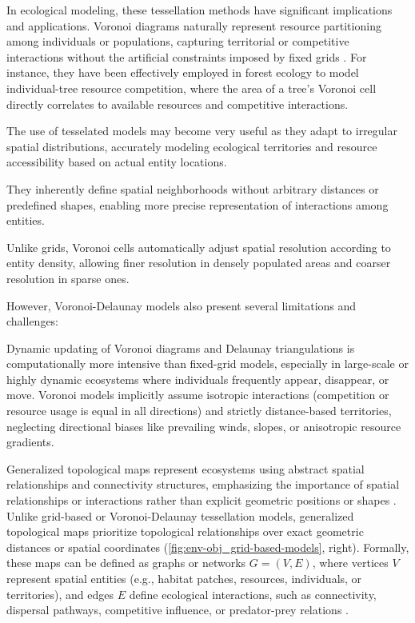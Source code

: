 In ecological modeling, these tessellation methods have significant implications and applications. Voronoi diagrams naturally represent resource partitioning among individuals or populations, capturing territorial or competitive interactions without the artificial constraints imposed by fixed grids \cite{Castle2006}. For instance, they have been effectively employed in forest ecology to model individual-tree resource competition, where the area of a tree's Voronoi cell directly correlates to available resources and competitive interactions.

The use of tesselated models may become very useful as they adapt to irregular spatial distributions, accurately modeling ecological territories and resource accessibility based on actual entity locations.

They inherently define spatial neighborhoods without arbitrary distances or predefined shapes, enabling more precise representation of interactions among entities.

Unlike grids, Voronoi cells automatically adjust spatial resolution according to entity density, allowing finer resolution in densely populated areas and coarser resolution in sparse ones.

However, Voronoi-Delaunay models also present several limitations and challenges:
\begin{Itemize}
    \Item{} Dynamic updating of Voronoi diagrams and Delaunay triangulations is computationally more intensive than fixed-grid models, especially in large-scale or highly dynamic ecosystems where individuals frequently appear, disappear, or move.
    \Item{} Voronoi models implicitly assume isotropic interactions (competition or resource usage is equal in all directions) and strictly distance-based territories, neglecting directional biases like prevailing winds, slopes, or anisotropic resource gradients.
\end{Itemize}


Generalized topological maps represent ecosystems using abstract spatial relationships and connectivity structures, emphasizing the importance of spatial relationships or interactions rather than explicit geometric positions or shapes \cite{Urban2009}. Unlike grid-based or Voronoi-Delaunay tessellation models, generalized topological maps prioritize topological relationships over exact geometric distances or spatial coordinates (\cref{fig:env-obj_grid-based-models}, right). Formally, these maps can be defined as graphs or networks $G = (V, E)$, where vertices $V$ represent spatial entities (e.g., habitat patches, resources, individuals, or territories), and edges $E$ define ecological interactions, such as connectivity, dispersal pathways, competitive influence, or predator-prey relations \cite{Hamonic2021,Minor2008,Peterson2024}.

